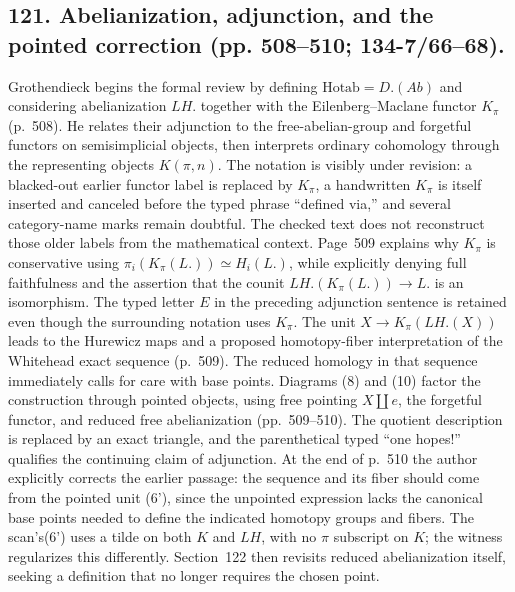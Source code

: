 \documentclass[10pt,oneside]{book}
\begin{document}
\subsection*{121. Abelianization, adjunction, and the pointed correction (pp. 508--510; 134-7/66--68).}
Grothendieck begins the formal review by defining $\mathrm{Hotab}=D.(Ab)$ and considering abel\-ian\-iza\-tion $LH.$ together with the Eilenberg--Maclane functor $K_\pi$ (p.~508). He relates their adjunction to the free-abelian-group and forgetful functors on semisimplicial objects, then interprets ordinary cohomology through the representing objects $K(\pi,n)$. The notation is visibly under revision: a blacked-out earlier functor label is replaced by $K_\pi$, a handwritten $K_\pi$ is itself inserted and canceled before the typed phrase ``defined via,'' and several category-name marks remain doubtful. The checked text does not reconstruct those older labels from the mathematical context. Page~509 explains why $K_\pi$ is conservative using $\pi_i(K_\pi(L.))\simeq H_i(L.)$, while explicitly denying full faithfulness and the assertion that the counit $LH.(K_\pi(L.))\to L.$ is an isomorphism. The typed letter $E$ in the preceding adjunction sentence is retained even though the surrounding notation uses $K_\pi$. The unit $X\to K_\pi(LH.(X))$ leads to the Hurewicz maps and a proposed homotopy-fiber interpretation of the Whitehead exact sequence (p.~509). The reduced homology in that sequence immediately calls for care with base points. Diagrams (8) and (10) factor the construction through pointed objects, using free pointing $X\amalg e$, the forgetful functor, and reduced free abelianization (pp.~509--510). The quotient description is replaced by an exact triangle, and the parenthetical typed ``one hopes!'' qualifies the continuing claim of adjunction. At the end of p.~510 the author explicitly corrects the earlier passage: the sequence and its fiber should come from the pointed unit (6'), since the unpointed expression lacks the canonical base points needed to define the indicated homotopy groups and fibers. The scan's(6') uses a tilde on both $K$ and $LH$, with no $\pi$ subscript on $K$; the witness regularizes this differently. Section~122 then revisits reduced abelianization itself, seeking a definition that no longer requires the chosen point.
\end{document}

